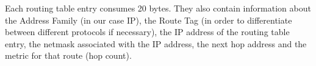 Each routing table entry consumes 20 bytes. They also contain information about the Address Family (in our case IP), the Route Tag (in order to differentiate between different protocols if necessary), the IP address of the routing table entry, the netmask associated with the IP address, the next hop address and the metric for that route (hop count).
